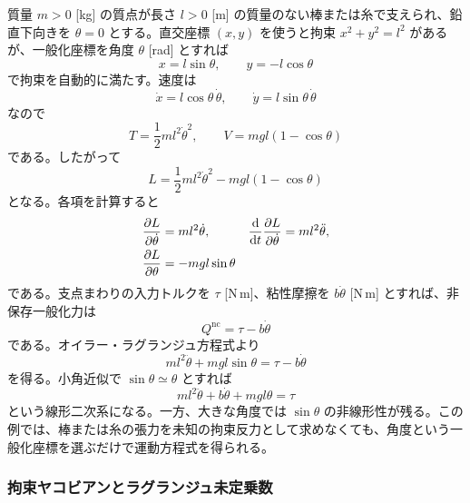 \begin{example}[単振子の一般化座標による導出]
質量 $m>0$ [kg] の質点が長さ $l>0$ [m] の質量のない棒または糸で支えられ、鉛直下向きを $\theta=0$ とする。直交座標 $(x,y)$ を使うと拘束 $x^2+y^2=l^2$ があるが、一般化座標を角度 $\theta$ [rad] とすれば
\begin{equation}
  x=l\sin\theta,\qquad
  y=-l\cos\theta
\end{equation}
で拘束を自動的に満たす。速度は
\begin{equation}
  \dot{x}=l\cos\theta\,\dot{\theta},
  \qquad
  \dot{y}=l\sin\theta\,\dot{\theta}
\end{equation}
なので
\begin{equation}
  T=\frac{1}{2}ml^2\dot{\theta}^2,
  \qquad
  V=mgl(1-\cos\theta)
\end{equation}
である。したがって
\begin{equation}
  L
  =
  \frac{1}{2}ml^2\dot{\theta}^2
  -
  mgl(1-\cos\theta)
\end{equation}
となる。各項を計算すると
\begin{align}
  \frac{\partial L}{\partial\dot{\theta}}
  &=
  ml^2\dot{\theta},&
  \frac{\mathrm{d}}{\mathrm{d} t}
  \frac{\partial L}{\partial\dot{\theta}}
  &=
  ml^2\ddot{\theta},\\
  \frac{\partial L}{\partial\theta}
  &=
  -mgl\sin\theta
\end{align}
である。支点まわりの入力トルクを $\tau$ [N\,m]、粘性摩擦を $b\dot{\theta}$ [N\,m] とすれば、非保存一般化力は
\begin{equation}
  Q^\mathrm{nc}=\tau-b\dot{\theta}
\end{equation}
である。オイラー・ラグランジュ方程式より
\begin{equation}
  ml^2\ddot{\theta}+mgl\sin\theta=\tau-b\dot{\theta}
\end{equation}
を得る。小角近似で $\sin\theta\simeq\theta$ とすれば
\begin{equation}
  ml^2\ddot{\theta}+b\dot{\theta}+mgl\theta=\tau
\end{equation}
という線形二次系になる。一方、大きな角度では $\sin\theta$ の非線形性が残る。この例では、棒または糸の張力を未知の拘束反力として求めなくても、角度という一般化座標を選ぶだけで運動方程式を得られる。
\end{example}

\subsubsection{拘束ヤコビアンとラグランジュ未定乗数}

